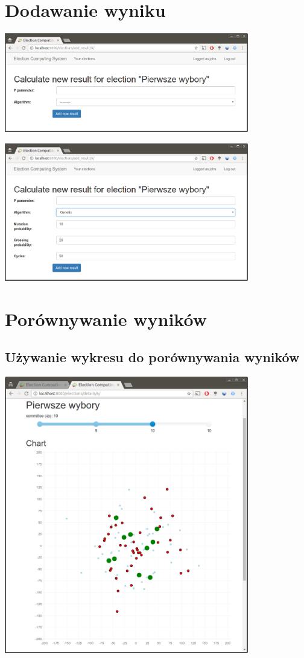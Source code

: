 \documentclass[pdflatex,11pt]{../aghdoc}
\begin{document}
\newpage
\section{Dodawanie wyniku}
\label{sec:dodawaniewyniku}


\includegraphics[width=0.8\textwidth]{pics/new-result.png}

\includegraphics[width=0.8\textwidth]{pics/new-result-genetic.png}

\newpage
\section{Porównywanie wyników}
\label{sec:porownywaniewynikow}

\subsection{Używanie wykresu do porównywania wyników}
\label{subsec:pornawykresie}

\includegraphics[width=0.8\textwidth]{pics/results-on-chart.png}
\end{document}
